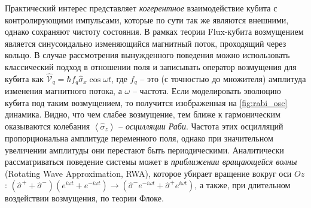 \documentclass[12pt, twoside]{report}
\numberwithin{equation}{section}
\numberwithin{figure}{section}
\begin{document}
Практический интерес представляет \textit{когерентное} взаимодействие кубита с контролирующими импульсами, которые по сути так же являются внешними, однако сохраняют чистоту состояния. В рамках теории Flux-кубита возмущением является синусоидально изменяющийся магнитный поток, проходящий через кольцо. В случае рассмотрения вынужденного поведения можно использовать классический подход в отношении поля и записывать оператор возмущения для кубита как $\mathcal{\hat V}_q = \hbar f_q \hat \sigma_x \cos\omega t$, где $f_q$ -- это (с точностью до множителя) амплитуда изменения магнитного потока, а $\omega$ -- частота. Если моделировать эволюцию кубита под таким возмущением, то получится изображенная на \autoref{fig:rabi_osc} динамика. Видно, что чем слабее возмущение, тем ближе к гармоническим оказываются колебания $\left<\hat \sigma_z\right>$ -- \textit{осцилляции Раби}. Частота этих осцилляций пропорциональна амплитуде переменного поля, однако при значительном увеличении амплитуды они перестают быть периодическими. Аналитически рассматриваться поведение системы может в 
\textit{приближении вращающейся волны}\cite{Jerger2013, Bishop2010, Bauer2006} (Rotating Wave Approximation, RWA), которое убирает вращение вокруг оси $Oz$: $ (\hat \sigma^+ + \hat \sigma^-)(e^{i\omega t}+e^{-i\omega t}) \rightarrow (\hat \sigma^- e^{-i\omega t} + \hat \sigma^+ e^{i\omega t})$, а также, при длительном воздействии возмущения, по теории Флоке\cite{Bauer2006}. 
\end{document}
